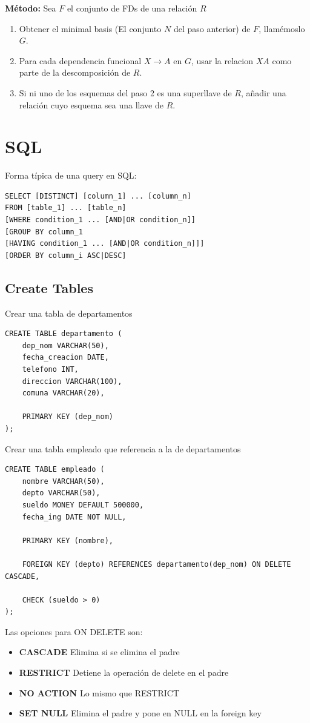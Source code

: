 \documentclass[11pt,letterpaper]{article}
\begin{document}
\textbf{Método:} Sea $F$ el conjunto de FDs de una relación $R$
\begin{enumerate}
	\item Obtener el minimal basis (El conjunto $N$ del paso anterior) de $F$, llamémoslo $G$.
	\item Para cada dependencia funcional $X\rightarrow A$ en $G$, usar la relacion $XA$ como parte de la descomposición de $R$.
	\item Si ni uno de los esquemas del paso 2 es una superllave de $R$, añadir una relación cuyo esquema sea una llave de $R$.
\end{enumerate}
\newpage
\section{SQL}
Forma típica de una query en SQL:
\begin{lstlisting}[frame=single]
SELECT [DISTINCT] [column_1] ... [column_n]	
FROM [table_1] ... [table_n]
[WHERE condition_1 ... [AND|OR condition_n]]
[GROUP BY column_1
[HAVING condition_1 ... [AND|OR condition_n]]]
[ORDER BY column_i ASC|DESC]
\end{lstlisting}


\subsection{Create Tables}
Crear una tabla de departamentos
\begin{lstlisting}[frame=single]
CREATE TABLE departamento (
	dep_nom VARCHAR(50),
	fecha_creacion DATE,
	telefono INT,
	direccion VARCHAR(100),
	comuna VARCHAR(20),
	
	PRIMARY KEY (dep_nom)
);
\end{lstlisting}
Crear una tabla empleado que referencia a la de departamentos
\begin{lstlisting}[frame=single]
CREATE TABLE empleado (
	nombre VARCHAR(50),
	depto VARCHAR(50),
	sueldo MONEY DEFAULT 500000,
	fecha_ing DATE NOT NULL,
	
	PRIMARY KEY (nombre),
	
	FOREIGN KEY (depto) REFERENCES departamento(dep_nom) ON DELETE CASCADE,
	
	CHECK (sueldo > 0)
);	
\end{lstlisting}
Las opciones para ON DELETE son:
\begin{itemize}
	\item \textbf{CASCADE} Elimina si se elimina el padre
	\item \textbf{RESTRICT} Detiene la operación de delete en el padre
	\item \textbf{NO ACTION} Lo mismo que RESTRICT
	\item \textbf{SET NULL} Elimina el padre y pone en NULL en la foreign key
\end{itemize}
\end{document}
